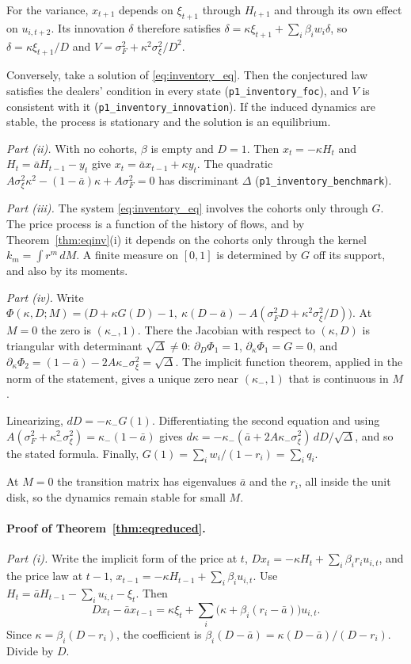 \documentclass[12pt]{article}
\theoremstyle{definition}
\theoremstyle{remark}
\begin{document}
For the variance, $x_{t+1}$ depends on $\xi_{t+1}$ through $H_{t+1}$ and through its own effect on $u_{i,t+2}$. Its innovation $\delta$ therefore satisfies $\delta=\kappa\xi_{t+1}+\sum_i\beta_iw_i\delta$, so $\delta=\kappa\xi_{t+1}/D$ and $V=\sigma_F^2+\kappa^2\sigma_\xi^2/D^2$.

Conversely, take a solution of \eqref{eq:inventory_eq}. Then the conjectured law satisfies the dealers' condition in every state (\nolinkurl{p1_inventory_foc}), and $V$ is consistent with it (\nolinkurl{p1_inventory_innovation}). If the induced dynamics are stable, the process is stationary and the solution is an equilibrium.

\emph{Part (ii).} With no cohorts, $\beta$ is empty and $D=1$. Then $x_t=-\kappa H_t$ and $H_t=\bar aH_{t-1}-y_t$ give $x_t=\bar ax_{t-1}+\kappa y_t$. The quadratic $A\sigma_\xi^2\kappa^2-(1-\bar a)\kappa+A\sigma_F^2=0$ has discriminant $\Delta$ (\nolinkurl{p1_inventory_benchmark}).

\emph{Part (iii).} The system \eqref{eq:inventory_eq} involves the cohorts only through $G$. The price process is a function of the history of flows, and by Theorem~\ref{thm:eqinv}(i) it depends on the cohorts only through the kernel $k_m=\int r^m\,dM$. A finite measure on $[0,1]$ is determined by $G$ off its support, and also by its moments.

\emph{Part (iv).} Write $\Phi(\kappa,D;M)=\bigl(D+\kappa G(D)-1,\ \kappa(D-\bar a)-A(\sigma_F^2D+\kappa^2\sigma_\xi^2/D)\bigr)$. At $M=0$ the zero is $(\kappa_-,1)$. There the Jacobian with respect to $(\kappa,D)$ is triangular with determinant $\sqrt\Delta\ne0$: $\partial_D\Phi_1=1$, $\partial_\kappa\Phi_1=G=0$, and $\partial_\kappa\Phi_2=(1-\bar a)-2A\kappa_-\sigma_\xi^2=\sqrt\Delta$. The implicit function theorem, applied in the norm of the statement, gives a unique zero near $(\kappa_-,1)$ that is continuous in $M$.

Linearizing, $dD=-\kappa_-G(1)$. Differentiating the second equation and using $A(\sigma_F^2+\kappa_-^2\sigma_\xi^2)=\kappa_-(1-\bar a)$ gives $d\kappa=-\kappa_-(\bar a+2A\kappa_-\sigma_\xi^2)\,dD/\sqrt\Delta$, and so the stated formula. Finally, $G(1)=\sum_iw_i/(1-r_i)=\sum_iq_i$.

At $M=0$ the transition matrix has eigenvalues $\bar a$ and the $r_i$, all inside the unit disk, so the dynamics remain stable for small $M$.

\paragraph{Proof of Theorem~\ref{thm:eqreduced}.}
\emph{Part (i).} Write the implicit form of the price at $t$, $Dx_t=-\kappa H_t+\sum_i\beta_ir_iu_{i,t}$, and the price law at $t-1$, $x_{t-1}=-\kappa H_{t-1}+\sum_i\beta_iu_{i,t}$. Use $H_t=\bar aH_{t-1}-\sum_iu_{i,t}-\xi_t$. Then
\[
 Dx_t-\bar ax_{t-1}=\kappa\xi_t+\sum_i\bigl(\kappa+\beta_i(r_i-\bar a)\bigr)u_{i,t}.
\]
Since $\kappa=\beta_i(D-r_i)$, the coefficient is $\beta_i(D-\bar a)=\kappa(D-\bar a)/(D-r_i)$. Divide by $D$.
\end{document}

